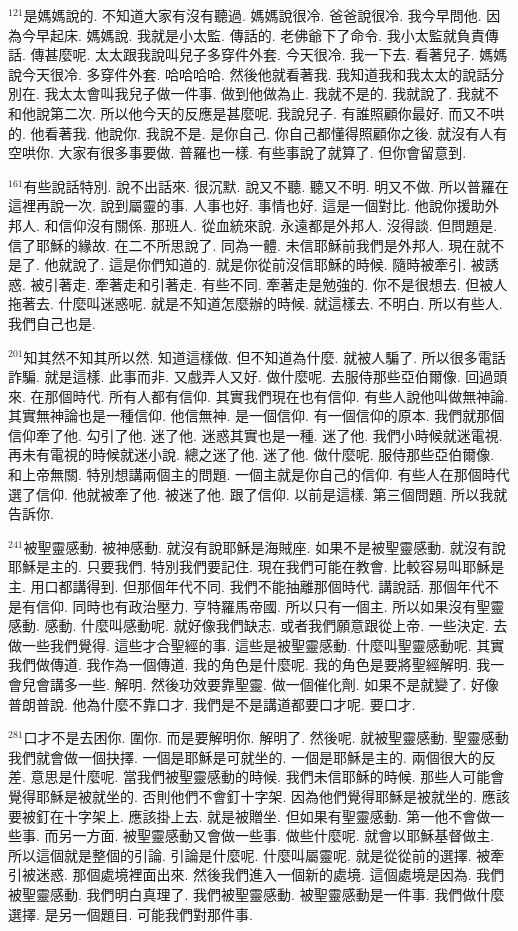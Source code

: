 \documentclass{book}
\begin{document}
$^{121}$是媽媽說的.
不知道大家有沒有聽過.
媽媽說很冷.
爸爸說很冷.
我今早問他.
因為今早起床.
媽媽說.
我就是小太監.
傳話的.
老佛爺下了命令.
我小太監就負責傳話.
傳甚麼呢.
太太跟我說叫兒子多穿件外套.
今天很冷.
我一下去.
看著兒子.
媽媽說今天很冷.
多穿件外套.
哈哈哈哈.
然後他就看著我.
我知道我和我太太的說話分別在.
我太太會叫我兒子做一件事.
做到他做為止.
我就不是的.
我就說了.
我就不和他說第二次.
所以他今天的反應是甚麼呢.
我說兒子.
有誰照顧你最好.
而又不哄的.
他看著我.
他說你.
我說不是.
是你自己.
你自己都懂得照顧你之後.
就沒有人有空哄你.
大家有很多事要做.
普羅也一樣.
有些事說了就算了.
但你會留意到.

$^{161}$有些說話特別.
說不出話來.
很沉默.
說又不聽.
聽又不明.
明又不做.
所以普羅在這裡再說一次.
說到屬靈的事.
人事也好.
事情也好.
這是一個對比.
他說你援助外邦人.
和信仰沒有關係.
那班人.
從血統來說.
永遠都是外邦人.
沒得談.
但問題是.
信了耶穌的緣故.
在二不所思說了.
同為一體.
未信耶穌前我們是外邦人.
現在就不是了.
他就說了.
這是你們知道的.
就是你從前沒信耶穌的時候.
隨時被牽引.
被誘惑.
被引著走.
牽著走和引著走.
有些不同.
牽著走是勉強的.
你不是很想去.
但被人拖著去.
什麼叫迷惑呢.
就是不知道怎麼辦的時候.
就這樣去.
不明白.
所以有些人.
我們自己也是.

$^{201}$知其然不知其所以然.
知道這樣做.
但不知道為什麼.
就被人騙了.
所以很多電話詐騙.
就是這樣.
此事而非.
又戲弄人又好.
做什麼呢.
去服侍那些亞伯爾像.
回過頭來.
在那個時代.
所有人都有信仰.
其實我們現在也有信仰.
有些人說他叫做無神論.
其實無神論也是一種信仰.
他信無神.
是一個信仰.
有一個信仰的原本.
我們就那個信仰牽了他.
勾引了他.
迷了他.
迷惑其實也是一種.
迷了他.
我們小時候就迷電視.
再未有電視的時候就迷小說.
總之迷了他.
迷了他.
做什麼呢.
服侍那些亞伯爾像.
和上帝無關.
特別想講兩個主的問題.
一個主就是你自己的信仰.
有些人在那個時代選了信仰.
他就被牽了他.
被迷了他.
跟了信仰.
以前是這樣.
第三個問題.
所以我就告訴你.

$^{241}$被聖靈感動.
被神感動.
就沒有說耶穌是海賊座.
如果不是被聖靈感動.
就沒有說耶穌是主的.
只要我們.
特別我們要記住.
現在我們可能在教會.
比較容易叫耶穌是主.
用口都講得到.
但那個年代不同.
我們不能抽離那個時代.
講說話.
那個年代不是有信仰.
同時也有政治壓力.
亨特羅馬帝國.
所以只有一個主.
所以如果沒有聖靈感動.
感動.
什麼叫感動呢.
就好像我們缺志.
或者我們願意跟從上帝.
一些決定.
去做一些我們覺得.
這些才合聖經的事.
這些是被聖靈感動.
什麼叫聖靈感動呢.
其實我們做傳道.
我作為一個傳道.
我的角色是什麼呢.
我的角色是要將聖經解明.
我一會兒會講多一些.
解明.
然後功效要靠聖靈.
做一個催化劑.
如果不是就變了.
好像普朗普說.
他為什麼不靠口才.
我們是不是講道都要口才呢.
要口才.

$^{281}$口才不是去困你.
圍你.
而是要解明你.
解明了.
然後呢.
就被聖靈感動.
聖靈感動我們就會做一個抉擇.
一個是耶穌是可就坐的.
一個是耶穌是主的.
兩個很大的反差.
意思是什麼呢.
當我們被聖靈感動的時候.
我們未信耶穌的時候.
那些人可能會覺得耶穌是被就坐的.
否則他們不會釘十字架.
因為他們覺得耶穌是被就坐的.
應該要被釘在十字架上.
應該掛上去.
就是被贈坐.
但如果有聖靈感動.
第一他不會做一些事.
而另一方面.
被聖靈感動又會做一些事.
做些什麼呢.
就會以耶穌基督做主.
所以這個就是整個的引論.
引論是什麼呢.
什麼叫屬靈呢.
就是從從前的選擇.
被牽引被迷惑.
那個處境裡面出來.
然後我們進入一個新的處境.
這個處境是因為.
我們被聖靈感動.
我們明白真理了.
我們被聖靈感動.
被聖靈感動是一件事.
我們做什麼選擇.
是另一個題目.
可能我們對那件事.
\end{document}
